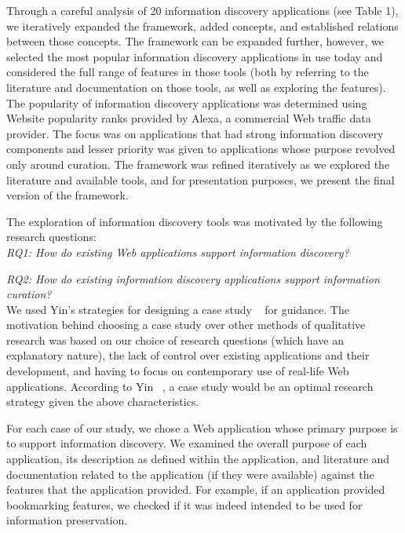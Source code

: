 \documentclass{casconpaper}
\begin{document}
{{Through a careful analysis of 20 information discovery applications (see Table 1), we iteratively expanded the framework, added concepts, and established relations between those concepts. The framework can be expanded further, however, we selected the most popular information discovery applications in use today and considered the full range of features in those tools (both by referring to the literature and documentation on those tools, as well as exploring the features). The popularity of information discovery applications was determined using Website popularity ranks provided by Alexa, a commercial Web traffic data provider. The focus was on applications that had strong information discovery components and lesser priority was given to applications whose purpose revolved only around curation. The framework was refined iteratively as we explored the literature and available tools, and for presentation purposes, we present the final version of the framework.

The exploration of information discovery tools was motivated by the following research questions:
\\

\emph{RQ1: How do existing Web applications support information discovery?}

\emph{RQ2: How do existing information discovery applications support information curation?}\\


We used Yin’s strategies for designing a case study ~\cite{yin} for guidance. The motivation behind choosing a case study over other methods of qualitative research was based on our choice of research questions (which have an explanatory nature), the lack of control over existing applications and their development, and having to focus on contemporary use of real-life Web applications. According to Yin ~\cite{yin}, a case study would be an optimal research strategy given the above characteristics.

For each case of our study, we chose a Web application whose primary purpose is to support information discovery. We examined the overall purpose of each application, its description as defined within the application, and literature and documentation related to the application (if they were available) against the features that the application provided. For example, if an application provided bookmarking features, we checked if it was indeed intended to be used for information preservation. 

}}
\end{document}
